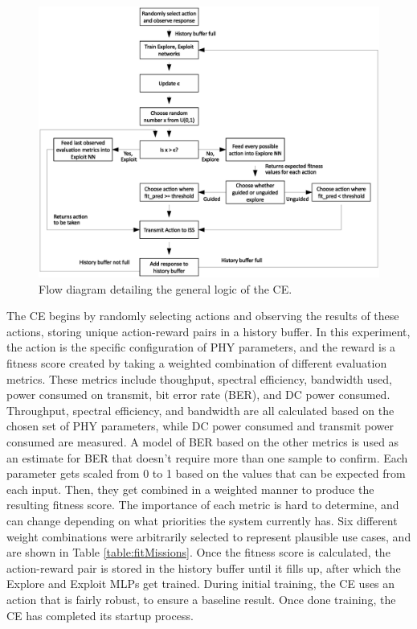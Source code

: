 \begin{landscape}
\begin{figure}[ht]
\includegraphics[width=\paperwidth]{figures/rough_flow_diagram.eps}
\caption{Flow diagram detailing the general logic of the CE.}\label{fig:ceDataFlow}
\end{figure}
\end{landscape}
\par The CE begins by randomly selecting actions and observing the results of these actions, storing unique action-reward pairs in a history buffer. In this experiment, the action is the specific configuration of PHY parameters, and the reward is a fitness score created by taking a weighted combination of different evaluation metrics. These metrics include thoughput, spectral efficiency, bandwidth used, power consumed on transmit, bit error rate (BER), and DC power consumed. Throughput, spectral efficiency, and bandwidth are all calculated based on the chosen set of PHY parameters, while DC power consumed and transmit power consumed are measured. A model of BER based on the other metrics is used as an estimate for BER that doesn't require more than one sample to confirm. Each parameter gets scaled from 0 to 1 based on the values that can be expected from each input. Then, they get combined in a weighted manner to produce the resulting fitness score. The importance of each metric is hard to determine, and can change depending on what priorities the system currently has. Six different weight combinations were arbitrarily selected to represent plausible use cases, and are shown in Table \ref{table:fitMissions}. Once the fitness score is calculated, the action-reward pair is stored in the history buffer until it fills up, after which the Explore and Exploit MLPs get trained. During initial training, the CE uses an action that is fairly robust, to ensure a baseline result. Once done training, the CE has completed its startup process.
